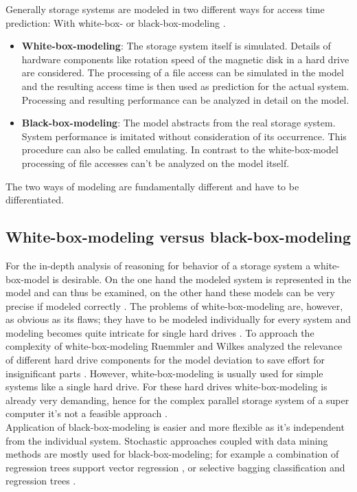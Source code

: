 \documentclass{superfri}
\begin{document}
Generally storage systems are modeled in two different ways for access time prediction: With white-box- or black-box-modeling \cite{Crume:2013:FML:2538542.2538561}.
\begin{itemize}
	\item \textbf{White-box-modeling}: The storage system itself is simulated. Details of hardware components like rotation speed of the magnetic disk in a hard drive are considered. The processing of a file access can be simulated in the model and the resulting access time is then used as prediction for the actual system.
	Processing and resulting performance can be analyzed in detail on the model.
	\item \textbf{Black-box-modeling}: The model abstracts from the real storage system. 
	System performance is imitated without consideration of its occurrence. %
	This procedure can also be called emulating.
	In contrast to the white-box-model processing of file accesses can't be analyzed on the model itself.
\end{itemize}
The two ways of modeling are fundamentally different and have to be differentiated.

\subsection{White-box-modeling versus black-box-modeling}
For the in-depth analysis of reasoning for behavior of a storage system a white-box-model is desirable.
On the one hand the modeled system is represented in the model and can thus be examined, on the other hand these models can be very precise if modeled correctly \cite{Ruemmler94anintroduction}.
The problems of white-box-modeling are, however, as obvious as its flaws; they have to be modeled individually for every system and modeling becomes quite intricate for single hard drives \cite{Crume:2013:FML:2538542.2538561}.
To approach the complexity of white-box-modeling Ruemmler and Wilkes analyzed the relevance of different hard drive components for the model deviation to save effort for insignificant parts \cite{Ruemmler94anintroduction}.
However, white-box-modeling is usually used for simple systems like a single hard drive. For these hard drives white-box-modeling is already very demanding, hence for the complex parallel storage system of a super computer it's not a feasible approach \cite{DBLP:conf/npc/ZhangLZJC10}.\\

Application of black-box-modeling is easier and more flexible as it's independent from the individual system.
Stochastic approaches coupled with data mining methods are mostly used for black-box-modeling; for example a combination of regression trees support vector regression \cite{Dai:2012:SDP:2477169.2477214}, or selective bagging classification and regression trees \cite{DBLP:conf/npc/ZhangLZJC10}.
\end{document}
